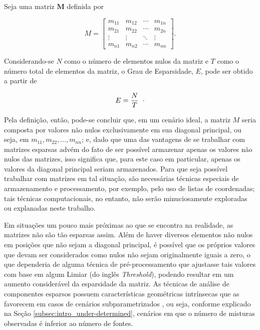 
\begin{definition}
    Seja uma matriz $\bm{M}$ definida por

    \begin{equation}
        M =
        \left[\begin{array}{cccc}
        m_{11} & m_{12} & \cdots & m_{1n} \\
        m_{21} & m_{22} & \cdots & m_{2n} \\
        \vdots & \vdots & \ddots & \vdots \\
        m_{n1} & m_{n2} & \cdots & m_{nn}
        \end{array}\right].
    \end{equation}

    Considerando-se $N$ como o número de elementos nulos da matriz e $T$ como o número total de elementos da matriz, o Grau de Esparsidade, $E$, pode ser obtido a partir de

    \begin{equation}
        E = \dfrac{N}{T}
        \hspace{0.2cm}\cdot
        \label{eq:bss_sparsity}
    \end{equation}

    \label{def:sparsity}
\end{definition}

Pela definição, então, pode-se concluir que, em um cenário ideal, a matriz $M$ seria composta por valores não nulos exclusivamente em sua diagonal principal, ou seja, em $m_{11}, m_{22}, \dots , m_{nn}$; e, dado que uma das vantagens de se trabalhar com matrizes esparsas advém do fato de ser possível armazenar apenas os valores não nulos das matrizes, isso significa que, para este caso em particular, apenas os valores da diagonal principal seriam armazenados. Para que seja possível trabalhar com matrizes em tal situação, são necessárias técnicas especiais de armazenamento e processamento, por exemplo, pelo uso de listas de coordenadas; tais técnicas computacionais, no entanto, não serão minuciosamente exploradas ou explanadas neste trabalho.

Em situações um pouco mais próximas ao que se encontra na realidade, as matrizes não são tão esparsas assim. Além de haver diversos elementos não nulos em posições que não sejam a diagonal principal, é possível que os próprios valores que devam ser considerados como nulos não sejam originalmente iguais a zero, o que dependeria de alguma técnica de pré-processamento que ajustasse tais valores com base em algum Limiar (do inglês \textit{Threshold}), podendo resultar em um aumento considerável da esparsidade da matriz. As técnicas de análise de componentes esparsos possuem características geométricas intrínsecas que as favorecem em casos de cenários subparametrizados \citep{theis2003linear}, ou seja, conforme explicado na Seção \ref{subsec:intro_under-determined}, cenários em que o número de misturas observadas é inferior ao número de fontes.

